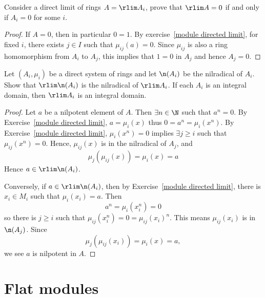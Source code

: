 \begin{exercise}\label{ring direct limit zero iff one zero}
Consider a direct limit of rings $A=\rlim A_i$, prove that $\rlim A=0$ if and only if $A_i=0$ for some $i$.
\end{exercise}
\begin{proof}
If $A=0$, then in particular $0=1$. By exercise~\ref{module directed limit}, for fixed $i$, there exists $j\in I$ such that $\mu_{ij}(a)=0$. Since $\mu_{ij}$ is also a ring homomorphism from $A_i$ to $A_j$, this implies that $1=0$ in $A_j$ and hence $A_j=0$.
\end{proof}
\begin{exercise}
Let $(A_i,\mu_i)$ be a direct system of rings and let $\n(A_i)$ be the nilradical of $A_i$. Show that $\rlim \n(A_i)$ is the nilradical of $\rlim A_i$. If each $A_i$ is an integral domain, then $\rlim A_i$ is an integral domain.
\end{exercise}
\begin{proof}
Let $a$ be a nilpotent element of $A$. Then $\exists n\in\N$ such that $a^n=0$. By Exercise~\ref{module directed limit}, $a=\mu_i(x)$ thus $0=a^n=\mu_i(x^n)$. By Exercise~\ref{module directed limit}, $\mu_i(x^n)=0$ implies $\exists j\geq i$ such that $\mu_{ij}(x^n)=0$. Hence, $\mu_{ij}(x)$ is in the nilradical of $A_j$, and
\[\mu_j(\mu_{ij}(x))=\mu_i(x)=a\]
Hence $a\in\rlim \n(A_i)$.\par
Conversely, if $a\in\rlim \n(A_i)$, then by Exercise~\ref{module directed limit}, there is $x_i\in M_i$ such that $\mu_i(x_i)=a$. Then 
\[a^n=\mu_i(x_i^n)=0\]
so there is $j\geq i$ such that $\mu_{ij}(x_i^n)=0=\mu_{ij}(x_i)^n$. This means $\mu_{ij}(x_i)$ is in $\n(A_j)$. Since
\[\mu_j(\mu_{ij}(x_i))=\mu_i(x)=a,\]
we see $a$ is nilpotent in $A$.
\end{proof}
\section{Flat modules}
